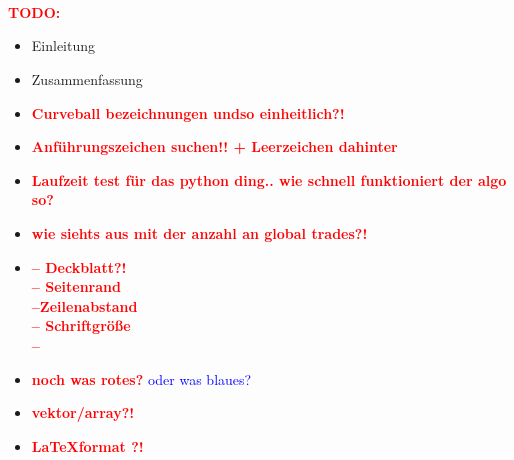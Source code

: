 \documentclass[a4paper, 11pt]{scrreprt}
\theoremstyle{plain} %
\theoremstyle{definition} %
\newcommand{\cb}{Curveball}
\newcommand{\red}[1]{\textcolor{red}{\textbf{#1}}}
\newcommand{\blue}[1]{\textcolor{blue}{#1}}
\begin{document}
~\\
\\
\\

\red{\Huge TODO:}
\begin{itemize}
	\item Einleitung
	\item Zusammenfassung
	\item \red{\Large \cb{} bezeichnungen undso einheitlich?!}
	\item \red{\Large Anführungszeichen suchen!! + Leerzeichen dahinter}
	\item \red{\huge Laufzeit test für das python ding.. wie schnell funktioniert der algo so?}
	\item \red{wie siehts aus mit der anzahl an global trades?!}
	\item \red{\Large -- Deckblatt?! \\ -- Seitenrand \\ --Zeilenabstand \\ -- Schriftgröße \\ --}
	\item \red{noch was rotes?} \blue{oder was blaues?}
	\item \red{vektor/array?!}
	\item \red{\LaTeX format ?!}
\end{itemize}













\listoffigures{}
\listoftables{}
\end{document}
